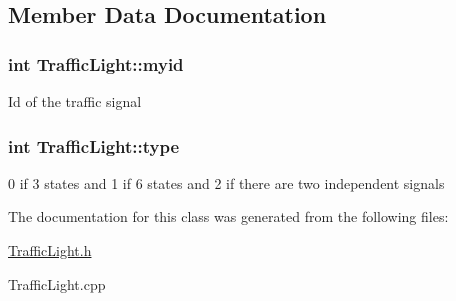 \subsection{Member Data Documentation}
\hypertarget{class_traffic_light_aa8b8852f0a75b737d741cdb831847208}{
\subsubsection[{myid}]{\setlength{\rightskip}{0pt plus 5cm}int Traffic\-Light\-::myid}}\label{class_traffic_light_aa8b8852f0a75b737d741cdb831847208}
Id of the traffic signal \hypertarget{class_traffic_light_abd951c68d768bc9d91aedd90e383a7b8}{
\subsubsection[{type}]{\setlength{\rightskip}{0pt plus 5cm}int Traffic\-Light\-::type}}\label{class_traffic_light_abd951c68d768bc9d91aedd90e383a7b8}
0 if 3 states and 1 if 6 states and 2 if there are two independent signals 

The documentation for this class was generated from the following files\-:\begin{DoxyCompactItemize}
\item 
\hyperlink{_traffic_light_8h}{Traffic\-Light.\-h}\item 
Traffic\-Light.\-cpp\end{DoxyCompactItemize}
